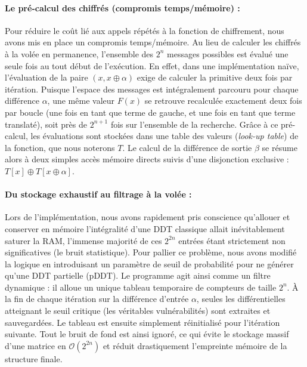 \documentclass[a4paper,11pt]{article}
\begin{document}
\paragraph{Le pré-calcul des chiffrés (compromis temps/mémoire) :}
Pour réduire le coût lié aux appels répétés à la fonction de chiffrement, nous avons mis en place un compromis temps/mémoire. Au lieu de calculer les chiffrés à la volée en permanence, l'ensemble des $2^n$ messages possibles est évalué une seule fois au tout début de l'exécution. En effet, dans une implémentation naïve, l'évaluation de la paire $(x, x \oplus \alpha)$ exige de calculer la primitive deux fois par itération. Puisque l'espace des messages est intégralement parcouru pour chaque différence $\alpha$, une même valeur $F(x)$ se retrouve recalculée exactement deux fois par boucle (une fois en tant que terme de gauche, et une fois en tant que terme translaté), soit près de $2^{n+1}$ fois sur l'ensemble de la recherche. Grâce à ce pré-calcul, les évaluations sont stockées dans une table des valeurs (\textit{look-up table}) de la fonction, que nous noterons $T$. Le calcul de la différence de sortie $\beta$ se résume alors à deux simples accès mémoire directs suivis d'une disjonction exclusive : $T[x] \oplus T[x \oplus \alpha]$.

\paragraph{Du stockage exhaustif au filtrage à la volée :}
Lors de l'implémentation, nous avons rapidement pris conscience qu'allouer et conserver en mémoire l'intégralité d'une DDT classique allait inévitablement saturer la RAM, l'immense majorité de ces $2^{2n}$ entrées étant strictement non significatives (le bruit statistique). Pour pallier ce problème, nous avons modifié la logique en introduisant un paramètre de seuil de probabilité pour ne générer qu'une DDT partielle (pDDT). Le programme agit ainsi comme un filtre dynamique : il alloue un unique tableau temporaire de compteurs de taille $2^n$. À la fin de chaque itération sur la différence d'entrée $\alpha$, seules les différentielles atteignant le seuil critique (les véritables vulnérabilités) sont extraites et sauvegardées. Le tableau est ensuite simplement réinitialisé pour l'itération suivante. Tout le bruit de fond est ainsi ignoré, ce qui évite le stockage massif d'une matrice en $\mathcal{O}(2^{2n})$ et réduit drastiquement l'empreinte mémoire de la structure finale.
\end{document}
